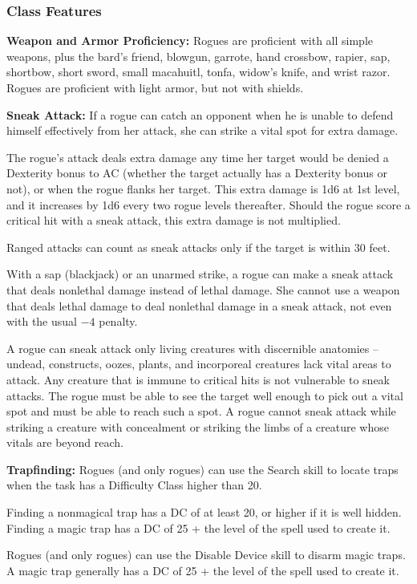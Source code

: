 \subsubsection{Class Features}
\textbf{Weapon and Armor Proficiency:} Rogues are proficient with all simple weapons, plus the bard's friend, blowgun, garrote, hand crossbow, rapier, sap, shortbow, short sword, small macahuitl, tonfa, widow's knife, and wrist razor. Rogues are proficient with light armor, but not with shields.

\textbf{Sneak Attack:} If a rogue can catch an opponent when he is unable to defend himself effectively from her attack, she can strike a vital spot for extra damage.

The rogue's attack deals extra damage any time her target would be denied a Dexterity bonus to AC (whether the target actually has a Dexterity bonus or not), or when the rogue flanks her target. This extra damage is 1d6 at 1st level, and it increases by 1d6 every two rogue levels thereafter. Should the rogue score a critical hit with a sneak attack, this extra damage is not multiplied.

Ranged attacks can count as sneak attacks only if the target is within 30 feet.

With a sap (blackjack) or an unarmed strike, a rogue can make a sneak attack that deals nonlethal damage instead of lethal damage. She cannot use a weapon that deals lethal damage to deal nonlethal damage in a sneak attack, not even with the usual $-4$ penalty.

A rogue can sneak attack only living creatures with discernible anatomies -- undead, constructs, oozes, plants, and incorporeal creatures lack vital areas to attack. Any creature that is immune to critical hits is not vulnerable to sneak attacks. The rogue must be able to see the target well enough to pick out a vital spot and must be able to reach such a spot. A rogue cannot sneak attack while striking a creature with concealment or striking the limbs of a creature whose vitals are beyond reach.

\textbf{Trapfinding:} Rogues (and only rogues) can use the Search skill to locate traps when the task has a Difficulty Class higher than 20.

Finding a nonmagical trap has a DC of at least 20, or higher if it is well hidden. Finding a magic trap has a DC of 25 + the level of the spell used to create it.

Rogues (and only rogues) can use the Disable Device skill to disarm magic traps. A magic trap generally has a DC of 25 + the level of the spell used to create it.


